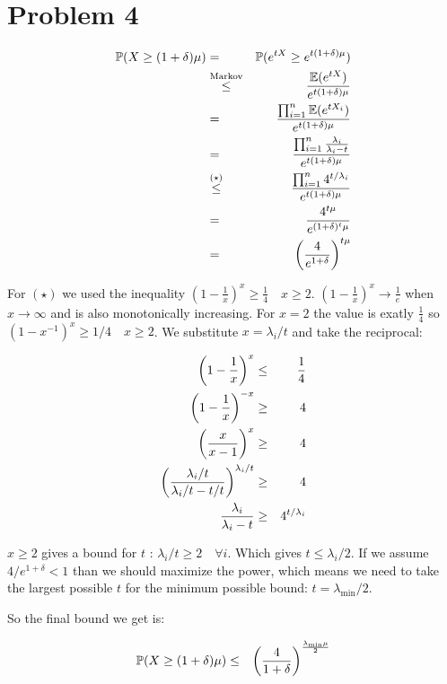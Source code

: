 \documentclass[a4paper]{article}
\begin{document}
\section*{Problem 4}

\begin{eqnarray*}
\mathbb{P}(X \ge (1 + \delta)\mu)
  &=& \mathbb{P}(e^{tX} \ge e^{t(1 + \delta)\mu}) \\
  &\overset{\mathrm{Markov}}{\le}& \frac{\mathbb{E}(e^{tX})}{e^{t(1 + \delta)\mu}} \\
  &=& \frac{\prod_{i=1}^{n} \mathbb{E}(e^{tX_i})}{e^{t(1 + \delta)\mu}} \\
  &=& \frac{\prod_{i=1}^{n} \frac{\lambda_i}{\lambda_i - t}}{e^{t(1 + \delta)\mu}} \\
  &\overset{(\star)}{\le}& \frac{\prod_{i=1}^{n} 4^{t/\lambda_i}}{e^{t(1 + \delta)\mu}} \\
  &=& \frac{4^{t\mu}}{e^{(1 + \delta)^t\mu}} \\
  &=& \left(\frac{4}{e^{1+\delta}}\right)^{t\mu} \\
\end{eqnarray*}

For $ (\star) $ we used the inequality $ (1 - \frac{1}{x})^x \ge \frac{1}{4}
\quad x \ge 2 $. $ (1 - \frac{1}{x})^x \to \frac{1}{e} $ when $ x \to \infty $ and is also
monotonically increasing. For $ x = 2 $ the value is exatly $ \frac{1}{4} $ so
$ (1 - x^{-1})^x \ge 1/4 \quad x \ge 2 $. We substitute $ x = \lambda_i
/ t $ and take the reciprocal:

\begin{eqnarray*}
\left(1 - \frac{1}{x}\right)^x &\le& \frac{1}{4} \\
\left(1 - \frac{1}{x}\right)^{-x} &\ge& 4 \\
\left(\frac{x}{x - 1}\right)^x &\ge& 4 \\
\left(\frac{\lambda_i/t}{\lambda_i/t - t/t}\right)^{\lambda_i/t} &\ge& 4 \\
\frac{\lambda_i}{\lambda_i - t} &\ge& 4^{t / \lambda_i} \\
\end{eqnarray*}

$ x \ge 2 $ gives a bound for $ t $ : $ \lambda_i / t \ge 2 \quad \forall i $.
Which gives $ t \le \lambda_i / 2 $. If we assume $ 4 / e^{1+\delta} < 1 $ than
we should maximize the power, which means we need to take the largest possible
$ t $ for the minimum possible bound: $ t = \lambda_{\mathrm{min}} / 2 $.

So the final bound we get is:

\begin{eqnarray*}
\mathbb{P}(X \ge (1 + \delta)\mu) &\le& \left(\frac{4}{1+\delta}\right)^{\frac{\lambda_{\mathrm{min}} \mu}{2}}
\end{eqnarray*}
\end{document}
